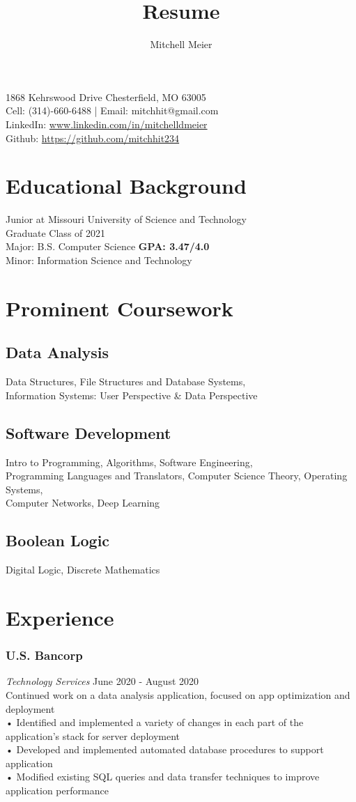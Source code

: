 \documentclass[11pt]{article}
\makeatletter
\renewcommand{\maketitle}{
\begin{center}
{\huge\bfseries
\theauthor}
 \vspace{.25em}

1868 Kehrswood Drive Chesterfield, MO 63005 \\
Cell: (314)-660-6488 | Email: mitchhit@gmail.com \\
LinkedIn: \url{www.linkedin.com/in/mitchelldmeier} \\
Github: \url{https://github.com/mitchhit234} \\
\end{center}
}
\makeatother
\begin{document}
\title{Resume}
\author{Mitchell Meier}
\maketitle



\section{Educational Background}
Junior at Missouri University of Science and Technology \\
Graduate Class of 2021 \\
Major: B.S. Computer Science \hspace*{\fill} \textbf{GPA: 3.47/4.0} \\
Minor: Information Science and Technology

\section{Prominent Coursework}

\subsection{Data Analysis}
Data Structures, File Structures and Database Systems, \\
Information Systems: User Perspective \& Data Perspective
\subsection{Software Development}     
Intro to Programming, Algorithms, Software Engineering, \\ Programming Languages and Translators, Computer Science Theory, Operating Systems, \\ Computer Networks, Deep Learning
\subsection{Boolean Logic}
Digital Logic, Discrete Mathematics

\section{Experience} 

\subsubsection{U.S. Bancorp} 
\hspace{.2in} \textit{Technology Services} \hspace*{\fill} June 2020 - August 2020 \\
Continued work on a data analysis application, focused on app optimization and deployment \\
• Identified and implemented a variety of changes in each part of the application's stack for server deployment \\
• Developed and implemented automated database procedures to support application \\
• Modified existing SQL queries and data transfer techniques to improve application performance 
\end{document}

